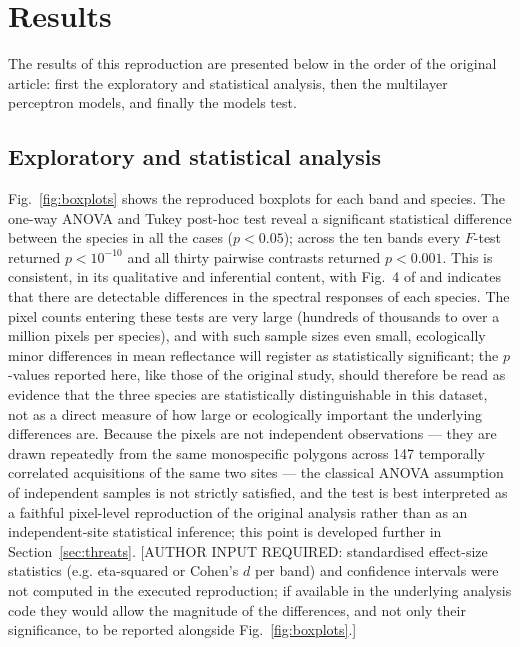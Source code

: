 \documentclass[10pt,twocolumn,a4paper]{article}
\begin{document}
\section{Results}
\label{sec:results}

The results of this reproduction are presented below in the order of the original article: first
the exploratory and statistical analysis, then the multilayer perceptron models, and finally the
models test.

\subsection{Exploratory and statistical analysis}
\label{sec:results-stats}

Fig.~\ref{fig:boxplots} shows the reproduced boxplots for each band and species. The one-way ANOVA
and Tukey post-hoc test reveal a significant statistical difference between the species in all the
cases ($p<0.05$); across the ten bands every $F$-test returned $p<10^{-10}$ and all thirty pairwise
contrasts returned $p<0.001$. This is consistent, in its qualitative and inferential content, with
Fig.~4 of \citet{monterrubio2025} and indicates that there are detectable differences in the
spectral responses of each species. The pixel counts entering these tests are very large
(hundreds of thousands to over a million pixels per species), and with such sample sizes even
small, ecologically minor differences in mean reflectance will register as statistically
significant; the $p$-values reported here, like those of the original study, should therefore be
read as evidence that the three species are statistically distinguishable in this dataset, not as
a direct measure of how large or ecologically important the underlying differences are. Because the
pixels are not independent observations --- they are drawn repeatedly from the same monospecific
polygons across 147 temporally correlated acquisitions of the same two sites --- the classical ANOVA
assumption of independent samples is not strictly satisfied, and the test is best interpreted as a
faithful pixel-level reproduction of the original analysis rather than as an independent-site
statistical inference; this point is developed further in Section~\ref{sec:threats}.
[AUTHOR INPUT REQUIRED: standardised effect-size statistics (e.g. eta-squared or Cohen's $d$ per
band) and confidence intervals were not computed in the executed reproduction; if available in the
underlying analysis code they would allow the magnitude of the differences, and not only their
significance, to be reported alongside Fig.~\ref{fig:boxplots}.]
\end{document}
